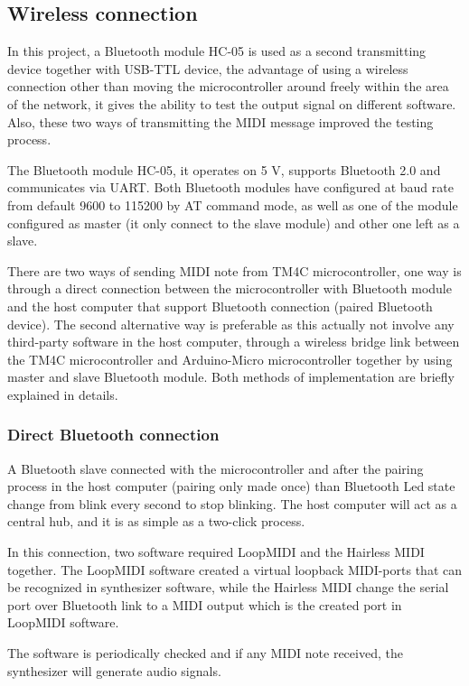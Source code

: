 \documentclass{article}
\begin{document}
\subsection{Wireless connection}
In this project, a Bluetooth module HC-05 is used as a second transmitting device together with USB-TTL device, the advantage of using a wireless connection other than moving the microcontroller around freely within the area of the network, it gives the ability to test the output signal on different software. Also, these two ways of transmitting the MIDI message improved the testing process. 

The Bluetooth module HC-05, it operates on 5 V, supports Bluetooth 2.0 and communicates via UART. Both Bluetooth modules have configured at baud rate from default 9600 to 115200 by AT command mode, as well as one of the module configured as master (it only connect to the slave module) and other one left as a slave.

There are two ways of sending MIDI note from TM4C microcontroller, one way is through a direct connection between the microcontroller with Bluetooth module and the host computer that support Bluetooth connection (paired Bluetooth device). The second alternative way is preferable as this actually not involve any third-party software in the host computer, through a wireless bridge link between the TM4C microcontroller and Arduino-Micro microcontroller together by using master and slave Bluetooth module. Both methods of implementation are briefly explained in details.

\subsubsection{Direct Bluetooth connection}
A Bluetooth slave connected with the microcontroller and after the pairing process in the host computer (pairing only made once) than Bluetooth Led state change from blink every second to stop blinking. The host computer will act as a central hub, and it is as simple as a two-click process.

In this connection, two software required LoopMIDI \cite{loopmidi} and the Hairless MIDI \cite{hairlessmidiserial} together. The LoopMIDI software created a virtual loopback MIDI-ports that can be recognized in synthesizer software, while the Hairless MIDI change the serial port over Bluetooth link to a MIDI output which is the created port in LoopMIDI software. 

The software is periodically checked and if any MIDI note received, the synthesizer will generate audio signals.
\end{document}
